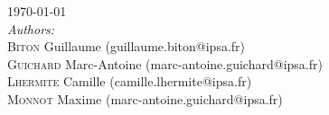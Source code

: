 \begin{titlepage}

{\large \today}\\[1cm] %

\large\emph{Authors:}\\
\textsc{Biton} Guillaume \small(guillaume.biton@ipsa.fr)\\
\textsc{Guichard} Marc-Antoine \small(marc-antoine.guichard@ipsa.fr)\\
\textsc{Lhermite} Camille \small(camille.lhermite@ipsa.fr)\\
\textsc{Monnot} Maxime \small(marc-antoine.guichard@ipsa.fr)\\[1cm]

 

\vfill %

\end{titlepage}